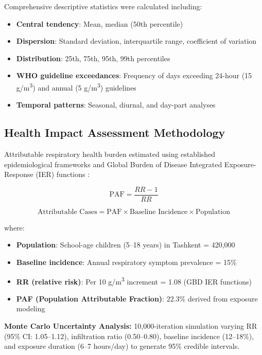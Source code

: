 \documentclass[11pt,a4paper]{article}
\begin{document}
Comprehensive descriptive statistics were calculated including:
\begin{itemize}
    \item \textbf{Central tendency}: Mean, median (50th percentile)
    \item \textbf{Dispersion}: Standard deviation, interquartile range, coefficient of variation
    \item \textbf{Distribution}: 25th, 75th, 95th, 99th percentiles
    \item \textbf{WHO guideline exceedances}: Frequency of days exceeding 24-hour (15 \textmu g/m\textsuperscript{3}) and annual (5 \textmu g/m\textsuperscript{3}) guidelines
    \item \textbf{Temporal patterns}: Seasonal, diurnal, and day-part analyses
\end{itemize}

\subsection{Health Impact Assessment Methodology}

Attributable respiratory health burden estimated using established epidemiological frameworks and Global Burden of Disease Integrated Exposure-Response (IER) functions \citep{burnett2014integrated}:

\begin{equation}
\text{PAF} = \frac{RR - 1}{RR}
\end{equation}

\begin{equation}
\text{Attributable Cases} = \text{PAF} \times \text{Baseline Incidence} \times \text{Population}
\end{equation}

\noindent where:
\begin{itemize}
    \item \textbf{Population}: School-age children (5--18 years) in Tashkent = 420,000
    \item \textbf{Baseline incidence}: Annual respiratory symptom prevalence = 15\%
    \item \textbf{RR (relative risk)}: Per 10 \textmu g/m\textsuperscript{3} increment = 1.08 (GBD IER functions)
    \item \textbf{PAF (Population Attributable Fraction)}: 22.3\% derived from exposure modeling
\end{itemize}

\textbf{Monte Carlo Uncertainty Analysis:} 10,000-iteration simulation varying RR (95\% CI: 1.05--1.12), infiltration ratio (0.50--0.80), baseline incidence (12--18\%), and exposure duration (6--7 hours/day) to generate 95\% credible intervals.
\end{document}
